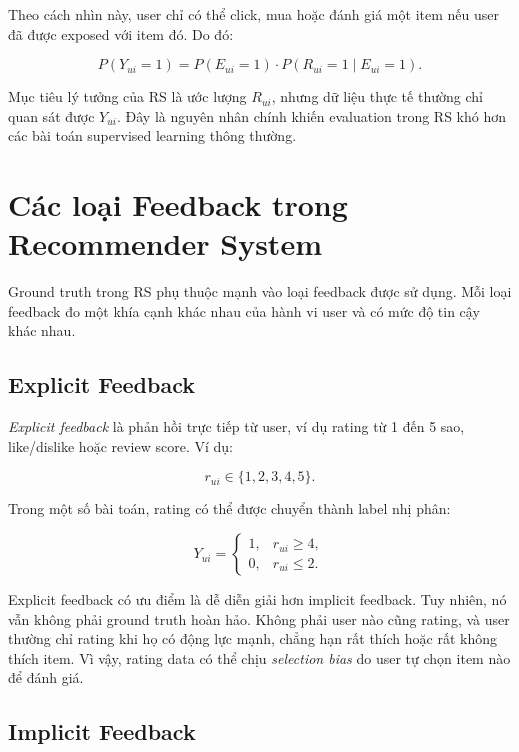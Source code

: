 \documentclass[12pt,a4paper]{article}
\begin{document}
Theo cách nhìn này, user chỉ có thể click, mua hoặc đánh giá một item nếu user đã được exposed với item đó. 
Do đó:

\begin{equation}
P(Y_{ui}=1) = P(E_{ui}=1) \cdot P(R_{ui}=1 \mid E_{ui}=1).
\end{equation}

Mục tiêu lý tưởng của RS là ước lượng $R_{ui}$, nhưng dữ liệu thực tế thường chỉ quan sát được $Y_{ui}$. 
Đây là nguyên nhân chính khiến evaluation trong RS khó hơn các bài toán supervised learning thông thường.

\section{Các loại Feedback trong Recommender System}

Ground truth trong RS phụ thuộc mạnh vào loại feedback được sử dụng. 
Mỗi loại feedback đo một khía cạnh khác nhau của hành vi user và có mức độ tin cậy khác nhau.

\subsection{Explicit Feedback}

\textit{Explicit feedback} là phản hồi trực tiếp từ user, ví dụ rating từ 1 đến 5 sao, like/dislike hoặc review score. 
Ví dụ:

\begin{equation}
r_{ui} \in \{1,2,3,4,5\}.
\end{equation}

Trong một số bài toán, rating có thể được chuyển thành label nhị phân:

\begin{equation}
Y_{ui} =
\begin{cases}
1, & r_{ui} \geq 4, \\
0, & r_{ui} \leq 2.
\end{cases}
\end{equation}

Explicit feedback có ưu điểm là dễ diễn giải hơn implicit feedback. 
Tuy nhiên, nó vẫn không phải ground truth hoàn hảo. 
Không phải user nào cũng rating, và user thường chỉ rating khi họ có động lực mạnh, chẳng hạn rất thích hoặc rất không thích item. 
Vì vậy, rating data có thể chịu \textit{selection bias} do user tự chọn item nào để đánh giá.

\subsection{Implicit Feedback}
\end{document}
